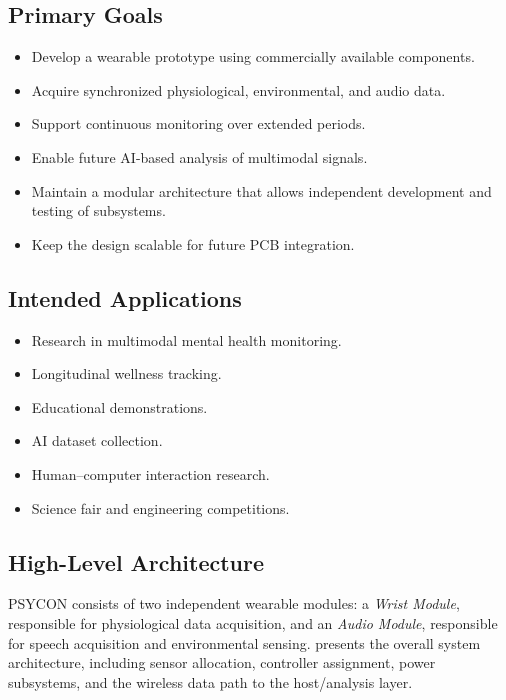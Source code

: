 \subsection{Primary Goals}
\label{sec:primary-goals}

\begin{itemize}
    \item Develop a wearable prototype using commercially available components.
    \item Acquire synchronized physiological, environmental, and audio data.
    \item Support continuous monitoring over extended periods.
    \item Enable future AI-based analysis of multimodal signals.
    \item Maintain a modular architecture that allows independent development and testing of subsystems.
    \item Keep the design scalable for future PCB integration.
\end{itemize}

\subsection{Intended Applications}
\label{sec:intended-applications}

\begin{itemize}
    \item Research in multimodal mental health monitoring.
    \item Longitudinal wellness tracking.
    \item Educational demonstrations.
    \item AI dataset collection.
    \item Human--computer interaction research.
    \item Science fair and engineering competitions.
\end{itemize}

\subsection{High-Level Architecture}
\label{sec:high-level-architecture}

PSYCON consists of two independent wearable modules: a \textit{Wrist Module}, responsible for physiological data acquisition, and an \textit{Audio Module}, responsible for speech acquisition and environmental sensing.  presents the overall system architecture, including sensor allocation, controller assignment, power subsystems, and the wireless data path to the host/analysis layer.

